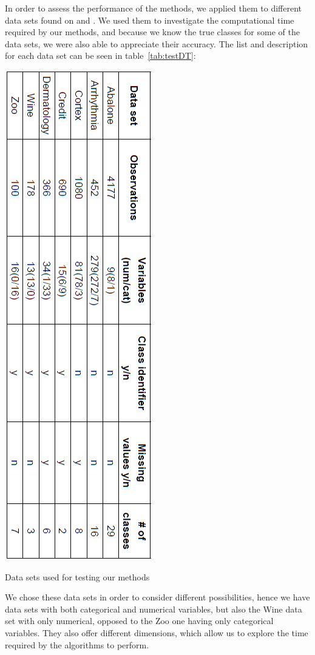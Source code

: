 \documentclass[twocolumn,12pt]{article}
\begin{document}
In order to assess the performance of the methods, we applied them to different data sets found on \cite{source1} and \cite{source2}.
We used them to investigate the computational time required by our methods, and because we know the true classes for some of the data sets, we were also able to appreciate their accuracy.
The list and description for each data set can be seen in table~\ref{tab:testDT}:
\begin{table}[!]
    \centering
    \includegraphics[scale=0.4]{img/dataSets.png}
    \caption{Data sets used for testing our methods}
    \label{tab:testDT}
\end{table}
We chose these data sets in order to consider different possibilities, hence we have data sets with both categorical and numerical variables, but also the Wine data set with only numerical, opposed to the Zoo one having only categorical variables.
They also offer different dimensions, which allow us to explore the time required by the algorithms to perform.
\end{document}
